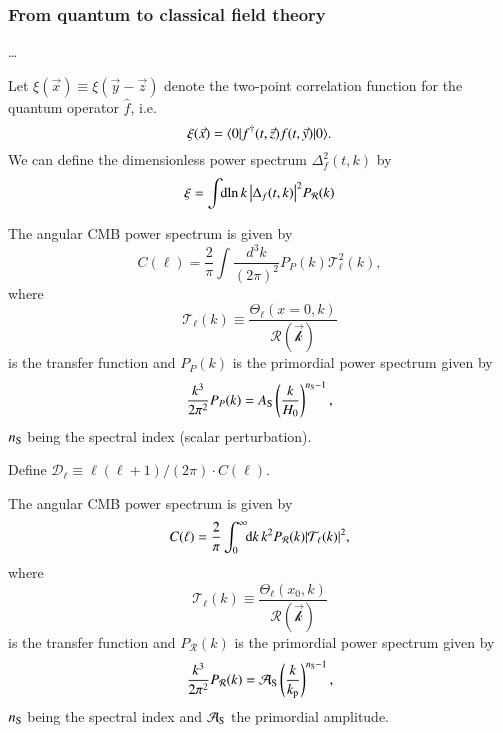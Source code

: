 




\subsubsection{From quantum to classical field theory}
    \dots


    Let $\xi(\vec{x}) \equiv \xi(\vec{y}-\vec{z})$ denote the two-point correlation function for the quantum operator $\hat{f}$, i.e.
    \begin{equation}
        \xi(\vec{x}) = \langle  0 | f^\dagger(t,\vec{z}) f(t, \vec{y}) |  0 \rangle.
    \end{equation}
    We can define the dimensionless power spectrum $\Delta_f^2(t, k)$ by
    \begin{equation}
        \xi = \int \!\!\mathop{}\!\mathrm{d} {\ln{k}}\, \abs{\Delta_f(t,k)}^2 P_\mathcal{R}(k)
    \end{equation}


\please

The angular CMB power spectrum is given by
\begin{equation}
    C(\ell)= \frac{2}{\pi} \int \frac{d^3 k}{(2\pi)^2} P_P(k) \mathcal{T}_\ell^2 (k),
\end{equation}
where
\begin{equation}
    \mathcal{T}_\ell(k) \equiv \frac{\Theta_\ell(x\!=\!0, k)}{\mathcal{R(\vec{k})}}
\end{equation}
is the transfer function and $P_P(k)$ is the primordial power spectrum given by
\begin{equation}
    \frac{k^3}{2\pi^2} P_P (k) = A_\mathrm{S}\left( \frac{k}{H_0}\right)^{n_\mathrm{S}-1},
\end{equation}
$n_\mathrm{S}$ being the spectral index (scalar perturbation).


Define $\mathcal{D}_\ell \equiv \ell (\ell+1)/(2\pi) \cdot C(\ell) $.

\sendhelp

\please

The angular CMB power spectrum is given by
\begin{equation}
    C(\ell)= \frac{2}{\pi} \int_0^\infty \!\!\mathop{}\!\mathrm{d} {k}\, k^2 P_\mathcal{R}(k) \abs{\mathcal{T}_\ell (k)}^2,
\end{equation}
where
\begin{equation}
    \mathcal{T}_\ell(k) \equiv \frac{\Theta_\ell(x_0, k)}{\mathcal{R(\vec{k})}}
\end{equation}
is the transfer function and $P_\mathcal{R}(k)$ is the primordial power spectrum given by
\begin{equation}
    \frac{k^3}{2\pi^2} P_\mathcal{R} (k) = \mathcal{A}_\mathrm{S}\left( \frac{k}{k_\mathrm{p}}\right)^{n_\mathrm{S}-1},
\end{equation}
$n_\mathrm{S}$ being the spectral index and $\mathcal{A}_\mathrm{S}$ the primordial amplitude.


